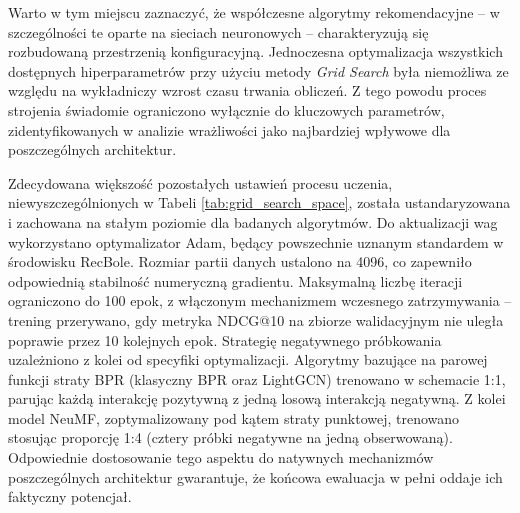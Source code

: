 Warto w tym miejscu zaznaczyć, że współczesne algorytmy rekomendacyjne -- w szczególności te oparte na sieciach neuronowych -- charakteryzują się rozbudowaną przestrzenią konfiguracyjną. Jednoczesna optymalizacja wszystkich dostępnych hiperparametrów przy użyciu metody \textit{Grid Search} była niemożliwa ze względu na wykładniczy wzrost czasu trwania obliczeń. Z tego powodu proces strojenia świadomie ograniczono wyłącznie do kluczowych parametrów, zidentyfikowanych w analizie wrażliwości jako najbardziej wpływowe dla poszczególnych architektur.

Zdecydowana większość pozostałych ustawień procesu uczenia, niewyszczególnionych w Tabeli \ref{tab:grid_search_space}, została ustandaryzowana i zachowana na stałym poziomie dla badanych algorytmów. Do aktualizacji wag wykorzystano optymalizator Adam, będący powszechnie uznanym standardem w środowisku RecBole. Rozmiar partii danych ustalono na 4096, co zapewniło odpowiednią stabilność numeryczną gradientu. Maksymalną liczbę iteracji ograniczono do 100 epok, z włączonym mechanizmem wczesnego zatrzymywania -- trening przerywano, gdy metryka NDCG@10 na zbiorze walidacyjnym nie uległa poprawie przez 10 kolejnych epok. Strategię negatywnego próbkowania uzależniono z kolei od specyfiki optymalizacji. Algorytmy bazujące na parowej funkcji straty BPR (klasyczny BPR oraz LightGCN) trenowano w schemacie 1:1, parując każdą interakcję pozytywną z jedną losową interakcją negatywną. Z kolei model NeuMF, zoptymalizowany pod kątem straty punktowej, trenowano stosując proporcję 1:4 (cztery próbki negatywne na jedną obserwowaną). Odpowiednie dostosowanie tego aspektu do natywnych mechanizmów poszczególnych architektur gwarantuje, że końcowa ewaluacja w pełni oddaje ich faktyczny potencjał.

\begin{table}[H]
    \centering
    \caption{Zestawienie przestrzeni hiperparametrów (siatki) dla poszczególnych algorytmów}
    \label{tab:grid_search_space}
    

    \vspace{0.2cm}
\end{table}

